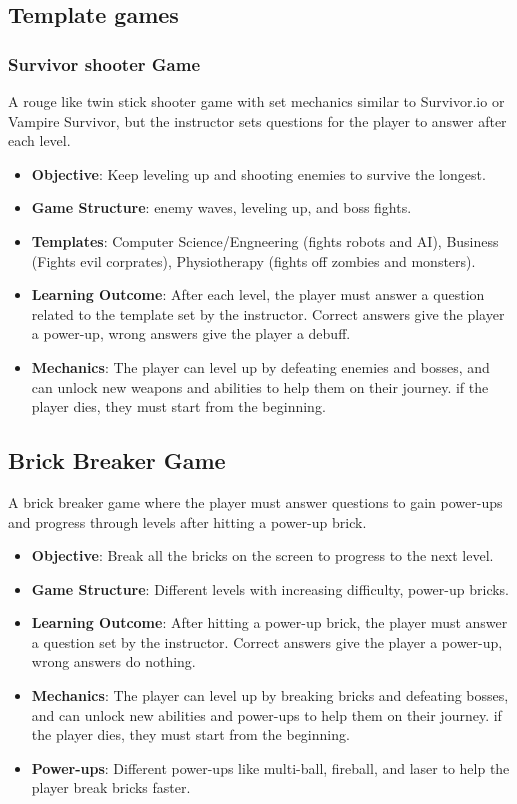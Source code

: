 \subsection{Template games}

\subsubsection{Survivor shooter Game}
A rouge like twin stick shooter game with set mechanics similar to Survivor.io or Vampire Survivor, but the instructor sets questions for the player to answer after each level.
\begin{itemize}
    \item \textbf{Objective}: Keep leveling up and shooting enemies to survive the longest. 
    \item \textbf{Game Structure}: enemy waves, leveling up, and boss fights.
    \item \textbf{Templates}: Computer Science/Engneering (fights robots and AI), Business (Fights evil corprates), Physiotherapy (fights off zombies and monsters).
    \item \textbf{Learning Outcome}: After each level, the player must answer a question related to the template set by the instructor. Correct answers give the player a power-up, wrong answers give the player a debuff.
    \item \textbf{Mechanics}: The player can level up by defeating enemies and bosses, and can unlock new weapons and abilities to help them on their journey. if the player dies, they must start from the beginning.
\end{itemize}

\subsection{Brick Breaker Game}
A brick breaker game where the player must answer questions to gain power-ups and progress through levels after hitting a power-up brick.
\begin{itemize}
    \item \textbf{Objective}: Break all the bricks on the screen to progress to the next level.
    \item \textbf{Game Structure}: Different levels with increasing difficulty, power-up bricks.
    \item \textbf{Learning Outcome}: After hitting a power-up brick, the player must answer a question set by the instructor. Correct answers give the player a power-up, wrong answers do nothing.
    \item \textbf{Mechanics}: The player can level up by breaking bricks and defeating bosses, and can unlock new abilities and power-ups to help them on their journey. if the player dies, they must start from the beginning.
    \item \textbf{Power-ups}: Different power-ups like multi-ball, fireball, and laser to help the player break bricks faster.
\end{itemize}

